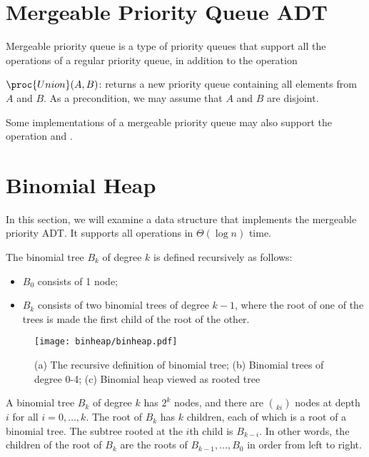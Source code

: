 \section{Mergeable Priority Queue ADT}

Mergeable priority queue is a type of priority queues that support all the operations of a regular priority queue, in addition to the operation 

$\proc{Union}(A,B)$: returns a new priority queue containing all elements from $A$ and $B$. As a precondition, we may assume that $A$ and $B$ are disjoint.

Some implementations of a mergeable priority queue may also support the operation  and .

\section{Binomial Heap}

In this section, we will examine a data structure that implements the mergeable priority ADT. It supports all operations in $\Theta(\log n)$ time.

\begin{definition}
    The binomial tree $B_k$ of degree $k$ is defined recursively as follows:
    \begin{itemize}
        \item $B_0$ consists of 1 node;
        \item $B_k$ consists of two binomial trees of degree $k-1$, where the root of one of the trees is made the first child of the root of the other.
    \end{itemize}
\end{definition}

\begin{figure}[htbp]
    \centering
    \texttt{[image: binheap/binheap.pdf]}
    \caption{(a) The recursive definition of binomial tree; (b) Binomial trees of degree 0-4; (c) Binomial heap viewed as rooted tree}
    \label{fig:binheap}
\end{figure}

A binomial tree $B_k$ of degree $k$ has $2^k$ nodes, and there are $\choose{k i}$ nodes at depth $i$ for all $i = 0,\ldots,k$. The root of $B_k$ has $k$ children, each of which is a root of a binomial tree. The subtree rooted at the $i$th child is $B_{k-i}$. In other words, the children of the root of $B_k$ are the roots of $B_{k-1},\ldots,B_{0}$ in order from left to right.

